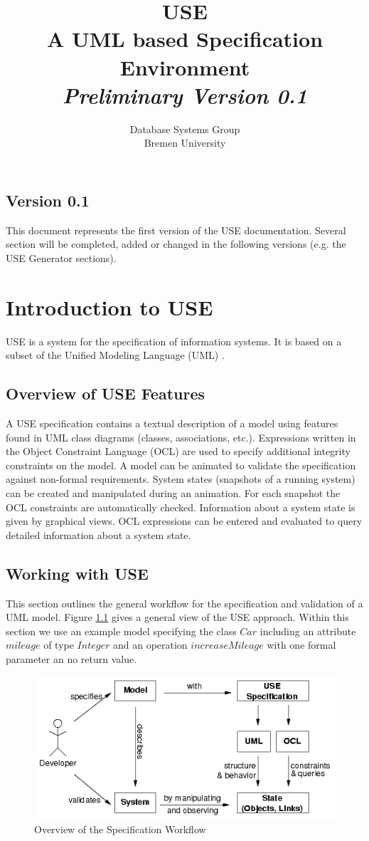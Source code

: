 \documentclass[a4paper,titlepage,oneside,final]{scrreprt} %
\title{USE \\ A UML based Specification Environment\\{\large \emph{Preliminary Version 0.1}}}
\author{Database Systems Group\\
Bremen University}
\begin{document}
\maketitle
\section*{Version 0.1}
This document represents the first version of the USE documentation.
Several section will be completed, added or changed in the following
versions (e.g. the USE Generator sections).
\newpage
\tableofcontents
\listoffigures
\chapter{Introduction to USE}
USE is a system for the specification of information systems.
It is based on a subset of the Unified Modeling Language (UML) \cite{uml:00-03-01}.
\section{Overview of USE Features}
A USE specification contains a textual description of a model
using features found in UML class diagrams (classes, associations, etc.).
Expressions written in the Object Constraint Language (OCL) are used to specify
additional integrity constraints on the model. A model can be animated to validate
the specification against non-formal requirements. System states (snapshots of a
running system) can be created and manipulated during an animation. For each
snapshot the OCL constraints are automatically checked. Information about a system
state is given by graphical views. OCL expressions can be entered and evaluated to
query detailed information about a system state.
\section{Working with USE}
This section outlines the general workflow for the specification and validation of a UML model.
Figure \ref{fig:workflow} gives a general view of the USE approach. Within this
section we use an example model specifying the class $\mathit{Car}$ including
an attribute $\mathit{mileage}$ of type $\mathit{Integer}$ and an
operation $\mathit{increaseMileage}$ with one formal parameter an no return value.
\begin{figure}[ht]
\centering
\includegraphics[scale=0.7]{Pictures/workflow.png}
\caption{Overview of the Specification Workflow}
\label{fig:workflow}
\end{figure}
\end{document}
